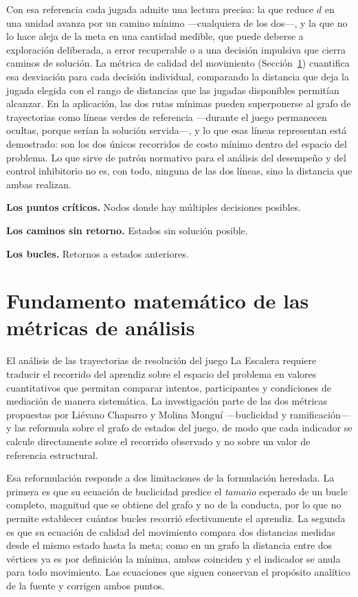 \documentclass{book}
\begin{document}
Con esa referencia cada jugada admite una lectura precisa: la que reduce
$d$ en una unidad avanza por un camino mínimo —cualquiera de los dos—, y
la que no lo hace aleja de la meta en una cantidad medible, que puede
deberse a exploración deliberada, a error recuperable o a una decisión
impulsiva que cierra caminos de solución. La métrica de calidad del
movimiento (Sección~\ref{sec:fundamento_ecuaciones}) cuantifica esa
desviación para cada decisión individual, comparando la distancia que
deja la jugada elegida con el rango de distancias que las jugadas
disponibles permitían alcanzar. En la aplicación, las dos rutas mínimas
pueden superponerse al grafo de trayectorias como líneas verdes de
referencia —durante el juego permanecen ocultas, porque serían la
solución servida—, y lo que esas líneas representan está demostrado: son
los dos únicos recorridos de costo mínimo dentro del espacio del
problema. Lo que sirve de patrón normativo para el análisis del
desempeño y del control inhibitorio no es, con todo, ninguna de las dos
líneas, sino la distancia que ambas realizan.
 

\textbf{Los puntos críticos.} Nodos donde hay múltiples decisiones posibles.

\textbf{Los caminos sin retorno.} Estados sin solución posible.

\textbf{Los bucles.} Retornos a estados anteriores.



%
%
%

\section{Fundamento matemático de las métricas de análisis}
\label{sec:fundamento_ecuaciones}

El análisis de las trayectorias de resolución del juego La
Escalera requiere traducir el recorrido del aprendiz sobre el
espacio del problema en valores cuantitativos que permitan
comparar intentos, participantes y condiciones de mediación de
manera sistemática. La investigación parte de las dos métricas
propuestas por Liévano Chaparro y Molina Monguí
\cite{LievanoMolina2022} —buclicidad y ramificación— y las
reformula sobre el grafo de estados del juego, de modo que cada
indicador se calcule directamente sobre el recorrido observado y
no sobre un valor de referencia estructural.

Esa reformulación responde a dos limitaciones de la formulación
heredada. La primera es que su ecuación de buclicidad predice el
\textit{tamaño} esperado de un bucle completo, magnitud que se
obtiene del grafo y no de la conducta, por lo que no permite
establecer cuántos bucles recorrió efectivamente el aprendiz. La
segunda es que su ecuación de calidad del movimiento compara dos
distancias medidas desde el mismo estado hasta la meta; como en un
grafo la distancia entre dos vértices ya es por definición la
mínima, ambas coinciden y el indicador se anula para todo
movimiento. Las ecuaciones que siguen conservan el propósito
analítico de la fuente y corrigen ambos puntos.
\end{document}

